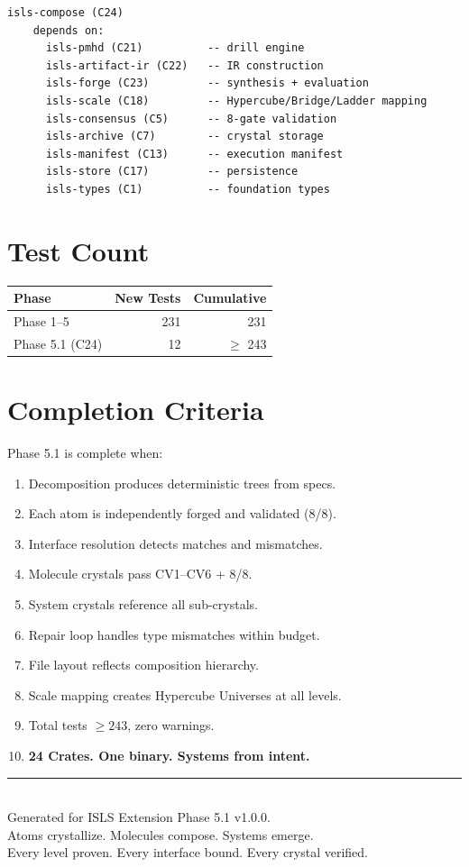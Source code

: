 \documentclass[11pt,a4paper,twoside]{article}
\theoremstyle{definition}
\theoremstyle{plain}
\theoremstyle{remark}
\newcommand{\ISLS}{\textsf{ISLS}}
\begin{document}
\begin{lstlisting}
isls-compose (C24)
    depends on:
      isls-pmhd (C21)          -- drill engine
      isls-artifact-ir (C22)   -- IR construction
      isls-forge (C23)         -- synthesis + evaluation
      isls-scale (C18)         -- Hypercube/Bridge/Ladder mapping
      isls-consensus (C5)      -- 8-gate validation
      isls-archive (C7)        -- crystal storage
      isls-manifest (C13)      -- execution manifest
      isls-store (C17)         -- persistence
      isls-types (C1)          -- foundation types
\end{lstlisting}

\section{Test Count}

\begin{tabular}{l r r}
\toprule
\textbf{Phase} & \textbf{New Tests} & \textbf{Cumulative} \\
\midrule
Phase 1--5 & 231 & 231 \\
Phase 5.1 (C24) & 12 & $\ge$ 243 \\
\bottomrule
\end{tabular}

\section{Completion Criteria}

Phase 5.1 is complete when:
\begin{enumerate}[nosep]
  \item Decomposition produces deterministic trees from specs.
  \item Each atom is independently forged and validated (8/8).
  \item Interface resolution detects matches and mismatches.
  \item Molecule crystals pass CV1--CV6 + 8/8.
  \item System crystals reference all sub-crystals.
  \item Repair loop handles type mismatches within budget.
  \item File layout reflects composition hierarchy.
  \item Scale mapping creates Hypercube Universes at all levels.
  \item Total tests $\ge 243$, zero warnings.
  \item \textbf{24 Crates. One binary. Systems from intent.}
\end{enumerate}


\vfill
\begin{center}
\rule{0.5\textwidth}{0.4pt}\\[0.5cm]
{\small Generated for \ISLS{} Extension Phase 5.1 v1.0.0.\\
Atoms crystallize. Molecules compose. Systems emerge.\\
Every level proven. Every interface bound. Every crystal verified.}
\end{center}
\end{document}
